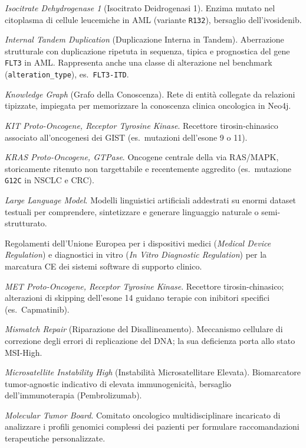 \documentclass[11pt,a4paper]{article}
\newcommand{\code}[1]{\texttt{\small #1}}
\begin{document}
\begin{description}[leftmargin=1.4em,style=nextline]
\item[IDH1] \emph{Isocitrate Dehydrogenase 1} (Isocitrato Deidrogenasi 1). Enzima mutato nel citoplasma di cellule leucemiche in AML (variante \code{R132}), bersaglio dell'ivosidenib.
\item[ITD] \emph{Internal Tandem Duplication} (Duplicazione Interna in Tandem). Aberrazione strutturale con duplicazione ripetuta in sequenza, tipica e prognostica del gene \code{FLT3} in AML. Rappresenta anche una classe di alterazione nel benchmark (\code{alteration\_type}), es.\ \code{FLT3-ITD}.
\item[KG] \emph{Knowledge Graph} (Grafo della Conoscenza). Rete di entità collegate da relazioni tipizzate, impiegata per memorizzare la conoscenza clinica oncologica in Neo4j.
\item[KIT] \emph{KIT Proto-Oncogene, Receptor Tyrosine Kinase}. Recettore tirosin-chinasico associato all'oncogenesi dei GIST (es.\ mutazioni dell'esone 9 o 11).
\item[KRAS] \emph{KRAS Proto-Oncogene, GTPase}. Oncogene centrale della via RAS/MAPK, storicamente ritenuto non targettabile e recentemente aggredito (es.\ mutazione \code{G12C} in NSCLC e CRC).
\item[LLM] \emph{Large Language Model}. Modelli linguistici artificiali addestrati su enormi dataset testuali per comprendere, sintetizzare e generare linguaggio naturale o semi-strutturato.
\item[MDR/IVDR] Regolamenti dell'Unione Europea per i dispositivi medici (\emph{Medical Device Regulation}) e diagnostici in vitro (\emph{In Vitro Diagnostic Regulation}) per la marcatura CE dei sistemi software di supporto clinico.
\item[MET] \emph{MET Proto-Oncogene, Receptor Tyrosine Kinase}. Recettore tirosin-chinasico; alterazioni di skipping dell'esone 14 guidano terapie con inibitori specifici (es.\ Capmatinib).
\item[MMR] \emph{Mismatch Repair} (Riparazione del Disallineamento). Meccanismo cellulare di correzione degli errori di replicazione del DNA; la sua deficienza porta allo stato MSI-High.
\item[MSI-High / MSI-H] \emph{Microsatellite Instability High} (Instabilità Microsatellitare Elevata). Biomarcatore tumor-agnostic indicativo di elevata immunogenicità, bersaglio dell'immunoterapia (Pembrolizumab).
\item[MTB] \emph{Molecular Tumor Board}. Comitato oncologico multidisciplinare incaricato di analizzare i profili genomici complessi dei pazienti per formulare raccomandazioni terapeutiche personalizzate.

\end{description}
\end{document}
